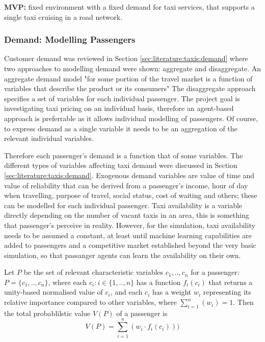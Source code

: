 \textbf{MVP:} fixed environment with a fixed demand for taxi services, that
supports a single taxi cruising in a road network.


\subsubsection{Demand: Modelling Passengers}
\label{sec:requirements:passenger}

Customer demand was reviewed in Section \ref{sec:literature:taxis:demand} where
two approaches to modelling demand were shown: aggregate and disaggregate. An
aggregate demand model "for some portion of the travel market is a function of
variables that describe the product or its consumers"
\parencite{Small2007taxi+urban} The disaggregate approach specifies a set of
variables for each individual passenger. The project goal is investigating taxi
pricing on an individual basis, therefore an agent-based approach is
preferrable as it allows individual modelling of passengers. Of course, to
express demand as a single variable it needs to be an aggregation of the
relevant individual variables.

Therefore each passenger's demand is a function that of some variables. The
different types of variables affecting taxi demand were discussed in Section
\ref{sec:literature:taxis:demand}. Exogenous demand variables are value of time
and value of reliability that can be derived from a passenger's income, hour of
day when travelling, purpose of travel, social status, cost of waiting and
others; these can be modelled for each individual passenger. Taxi availability
is a variable directly depending on the number of vacant taxis in an area, this
is something that passenger's perceive in reality. However, for the simulation,
taxi availability needs to be assumed a constant, at least until machine
learning capabilities are added to passengers and a competitive market
established beyond the very basic simulation, so that passanger agents can
learn the availability on their own.

Let \(P\) be the set of relevant characteristic variables \(c_1,..,c_n\) for a
passenger: \(P = \{c_1,..,c_n\}\), \newline
where each \(c_i : i \in \{1, .., n\}\) has a function \(f_i (c_i) \) that
returns a unity-based normalised value of \(c_i\), \newline
and each \(c_i\) has a weight \(w_i\) representing its relative importance
compared to other variables, where \(\sum_{i=1}^n (w_i) = 1 \). \newline
Then the total probablilstic value \(V(P)\) of a passenger is \[ V(P) =
\sum_{i=1}^{n} (w_i \cdot f_i(c_i) )) \] \newline

